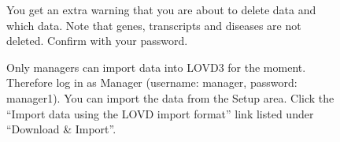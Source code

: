 \begin{figure}[ht]
  \begin{shaded}
	  \caption{You get an extra warning that you are about to delete data and which data.
	  Note that genes, transcripts and diseases are not deleted.
	  Confirm with your password.}
		\label{fig:export_IV}
  \end{shaded}
\end{figure}

\begin{figure}[ht]
  \begin{shaded}
	  \caption{Only managers can import data into LOVD3 for the moment. 
		Therefore log in as Manager (username: manager, password: manager1).
	  You can import the data from the Setup area.
	  Click the ``Import data using the LOVD import format'' link listed under ``Download \& Import''.}
		\label{fig:export_V}
  \end{shaded}
\end{figure}

